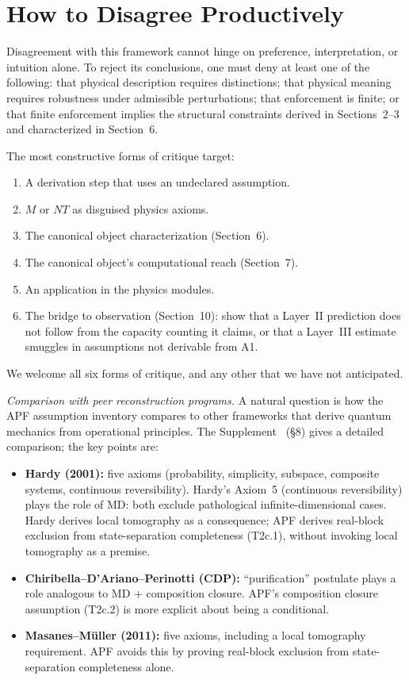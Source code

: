 \documentclass[11pt]{article}
\begin{document}
\section{How to Disagree Productively}

Disagreement with this framework cannot hinge on preference, interpretation, or intuition alone.  To reject its conclusions, one must deny at least one of the following: that physical description requires distinctions; that physical meaning requires robustness under admissible perturbations; that enforcement is finite; or that finite enforcement implies the structural constraints derived in Sections~2--3 and characterized in Section~6.

The most constructive forms of critique target:

\begin{enumerate}[label=(\alph*),nosep]
\item A derivation step that uses an undeclared assumption.
\item $M$ or $NT$ as disguised physics axioms.
\item The canonical object characterization (Section~6).
\item The canonical object's computational reach (Section~7).
\item An application in the physics modules.
\item The bridge to observation (Section~10): show that a Layer~II prediction does not follow from the capacity counting it claims, or that a Layer~III estimate smuggles in assumptions not derivable from A1.
\end{enumerate}

We welcome all six forms of critique, and any other that we have not anticipated.

\medskip
\noindent\textit{Comparison with peer reconstruction programs.}  A natural question is how the APF assumption inventory compares to other frameworks that derive quantum mechanics from operational principles.  The Supplement~\cite{Supp} (§8) gives a detailed comparison; the key points are:

\begin{itemize}[nosep,leftmargin=2em]
\item \textbf{Hardy (2001):} five axioms (probability, simplicity, subspace, composite systems, continuous reversibility).  Hardy's Axiom~5 (continuous reversibility) plays the role of MD: both exclude pathological infinite-dimensional cases.  Hardy derives local tomography as a consequence; APF derives real-block exclusion from state-separation completeness (T2c.1), without invoking local tomography as a premise.

\item \textbf{Chiribella--D'Ariano--Perinotti (CDP):} ``purification'' postulate plays a role analogous to MD + composition closure.  APF's composition closure assumption (T2c.2) is more explicit about being a conditional.

\item \textbf{Masanes--Müller (2011):} five axioms, including a local tomography requirement.  APF avoids this by proving real-block exclusion from state-separation completeness alone.
\end{itemize}
\end{document}
